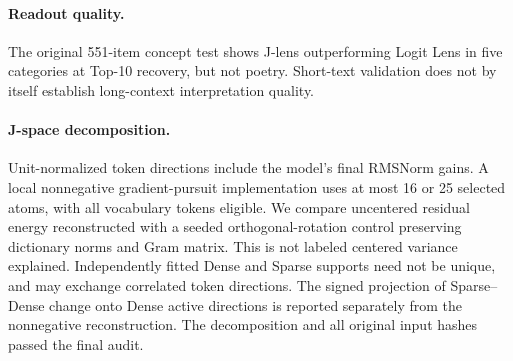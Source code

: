 \documentclass[11pt]{article}
\begin{document}
\paragraph{Readout quality.} The original 551-item concept test shows J-lens outperforming Logit Lens in five categories at Top-10 recovery, but not poetry. Short-text validation does not by itself establish long-context interpretation quality.
\paragraph{J-space decomposition.} Unit-normalized token directions include the model's final RMSNorm gains. A local nonnegative gradient-pursuit implementation uses at most 16 or 25 selected atoms, with all vocabulary tokens eligible. We compare uncentered residual energy reconstructed with a seeded orthogonal-rotation control preserving dictionary norms and Gram matrix. This is not labeled centered variance explained. Independently fitted Dense and Sparse supports need not be unique, and may exchange correlated token directions. The signed projection of Sparse--Dense change onto Dense active directions is reported separately from the nonnegative reconstruction. The decomposition and all original input hashes passed the final audit.
\clearpage
\end{document}
